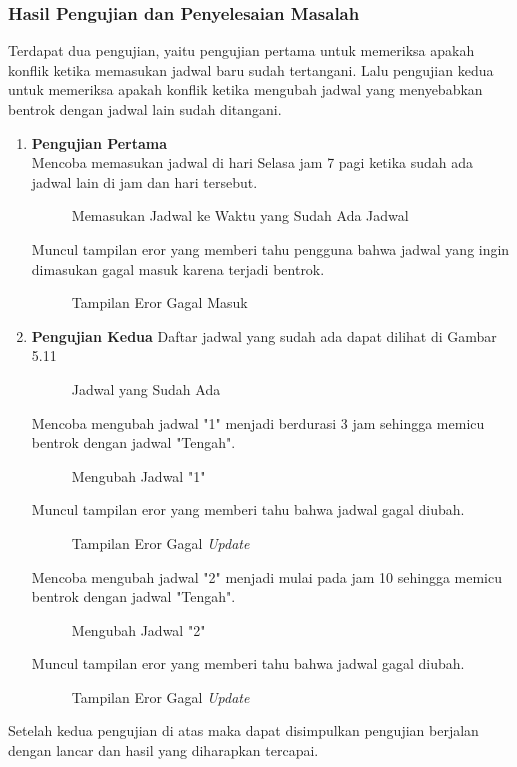\subsubsection{Hasil Pengujian dan Penyelesaian Masalah}
Terdapat dua pengujian, yaitu pengujian pertama untuk memeriksa apakah konflik ketika memasukan jadwal baru sudah tertangani. Lalu pengujian kedua untuk memeriksa apakah konflik ketika mengubah jadwal yang menyebabkan bentrok dengan jadwal lain sudah ditangani.
\begin{enumerate}
	\item \textbf{Pengujian Pertama}\\
	Mencoba memasukan jadwal di hari Selasa jam 7 pagi ketika sudah ada jadwal lain di jam dan hari tersebut.
\begin{figure} [H]
	\centering  
	\caption[Memasukan Jadwal ke Waktu yang Sudah Ada Jadwal]{Memasukan Jadwal ke Waktu yang Sudah Ada Jadwal} 
\end{figure}
	Muncul tampilan eror yang memberi tahu pengguna bahwa jadwal yang ingin dimasukan gagal masuk karena terjadi bentrok.
\begin{figure} [H]
	\centering  
	\caption[Tampilan Eror Gagal Masuk]{Tampilan Eror Gagal Masuk} 
\end{figure}

	\item \textbf{Pengujian Kedua}
	Daftar jadwal yang sudah ada dapat dilihat di Gambar 5.11
	\begin{figure} [H]
	\centering  
	\caption[Jadwal yang Sudah Ada]{Jadwal yang Sudah Ada} 
	\end{figure}
	Mencoba mengubah jadwal "1" menjadi berdurasi 3 jam sehingga memicu bentrok dengan jadwal "Tengah".
	\begin{figure} [H]
	\centering  
	\caption[Mengubah Jadwal "1"]{Mengubah Jadwal "1"} 
	\end{figure}
	Muncul tampilan eror yang memberi tahu bahwa jadwal gagal diubah.
	\begin{figure} [H]
	\centering  
	\caption[Tampilan Eror Gagal \textit{Update}]{Tampilan Eror Gagal \textit{Update}} 
	\end{figure}
	Mencoba mengubah jadwal "2" menjadi mulai pada jam 10 sehingga memicu bentrok dengan jadwal "Tengah".
	\begin{figure} [H]
	\centering  
	\caption[Mengubah Jadwal "2"]{Mengubah Jadwal "2"} 
	\end{figure}
	Muncul tampilan eror yang memberi tahu bahwa jadwal gagal diubah.
	\begin{figure} [H]
	\centering  
	\caption[Tampilan Eror Gagal \textit{Update}]{Tampilan Eror Gagal \textit{Update}} 
	\end{figure}
\end{enumerate}
Setelah kedua pengujian di atas maka dapat disimpulkan pengujian berjalan dengan lancar dan hasil yang diharapkan tercapai.

